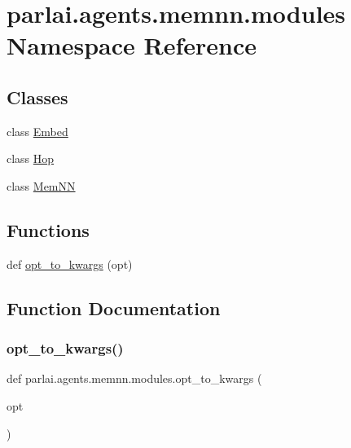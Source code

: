 \hypertarget{namespaceparlai_1_1agents_1_1memnn_1_1modules}{}\section{parlai.\+agents.\+memnn.\+modules Namespace Reference}
\label{namespaceparlai_1_1agents_1_1memnn_1_1modules}
\subsection*{Classes}
\begin{DoxyCompactItemize}
\item 
class \hyperlink{classparlai_1_1agents_1_1memnn_1_1modules_1_1Embed}{Embed}
\item 
class \hyperlink{classparlai_1_1agents_1_1memnn_1_1modules_1_1Hop}{Hop}
\item 
class \hyperlink{classparlai_1_1agents_1_1memnn_1_1modules_1_1MemNN}{Mem\+NN}
\end{DoxyCompactItemize}
\subsection*{Functions}
\begin{DoxyCompactItemize}
\item 
def \hyperlink{namespaceparlai_1_1agents_1_1memnn_1_1modules_a2c4bbfc9a0eb3220cd85bb8dd94b147c}{opt\+\_\+to\+\_\+kwargs} (opt)
\end{DoxyCompactItemize}


\subsection{Function Documentation}
\mbox{\label{namespaceparlai_1_1agents_1_1memnn_1_1modules_a2c4bbfc9a0eb3220cd85bb8dd94b147c}} 
\subsubsection{\texorpdfstring{opt\+\_\+to\+\_\+kwargs()}{opt\_to\_kwargs()}}
{\footnotesize\ttfamily def parlai.\+agents.\+memnn.\+modules.\+opt\+\_\+to\+\_\+kwargs (\begin{DoxyParamCaption}\item[{}]{opt }\end{DoxyParamCaption})}

